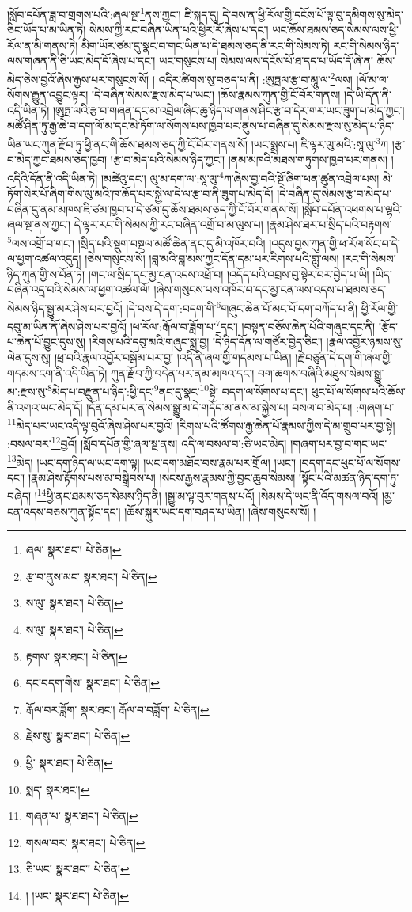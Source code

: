 །སློབ་དཔོན་ཟླ་བ་གྲགས་པའི་:ཞལ་སྔ་\footnote{ཞལ་  སྣར་ཐང་།  པེ་ཅིན། }ནས་ཀྱང་། ཇི་སྐད་དུ། དེ་བས་ན་ཕྱི་རོལ་གྱི་དངོས་པོ་ལྟ་བུ་དམིགས་སུ་མེད་ཅིང་ཡོད་པ་མ་ཡིན་ཏེ། སེམས་ཀྱི་རང་བཞིན་ཡིན་པའི་ཕྱིར་རོ་ཞེས་པ་དང་། ཡང་ཆོས་ཐམས་ཅད་སེམས་ལས་ཕྱི་རོལ་ན་མི་གནས་ཏེ། མིག་ཡོར་ཙམ་དུ་སྣང་བ་གང་ཡིན་པ་དེ་ཐམས་ཅད་ནི་རང་གི་སེམས་ཏེ། རང་གི་སེམས་ཉིད་ལས་གཞན་ནི་ཅི་ཡང་མེད་དོ་ཞེས་པ་དང་། ཡང་གསུངས་པ། སེམས་ལས་དངོས་པོ་ཐ་དད་པ་ཡོད་དོ་ཞེ་ན། ཆོས་མེད་ཅེས་བྱའོ་ཞེས་རྒྱས་པར་གསུངས་སོ། །
འདིར་ཚིགས་སུ་བཅད་པ་ནི། :ཨུཏྤལ་རྩ་བ་མཱུ་ལ་\footnote{རྩ་བ་ནུས་མང་  སྣར་ཐང་།  པེ་ཅིན། }ལས། །ལོ་མ་ལ་སོགས་རྒྱུན་འབྱུང་ལྟར། །དེ་བཞིན་སེམས་རྫས་མེད་པ་ཡང་། །ཆོས་རྣམས་ཀུན་གྱི་ངོ་བོར་གནས། །དེ་ཡི་དོན་ནི་འདི་ཡིན་ཏེ། །ཨུཏྤ་ལའི་རྩ་བ་གཞན་དང་མ་འབྲེལ་ཞིང་ཆུ་ཉིད་ལ་གནས་ཤིང་རྩ་བ་དེར་གར་ཡང་ཟུག་པ་མེད་ཀྱང་། མཚོ་ཤིན་ཏུ་རྒྱ་ཆེ་བ་དག་ལོ་མ་དང་མེ་ཏོག་ལ་སོགས་པས་ཁྱབ་པར་ནུས་པ་བཞིན་དུ་སེམས་རྫས་སུ་མེད་པ་ཉིད་ཡིན་ཡང་ཀུན་རྫོབ་ཏུ་ཕྱི་ནང་གི་ཆོས་ཐམས་ཅད་ཀྱི་ངོ་བོར་གནས་སོ། །ཡང་སྨྲས་པ། ཇི་ལྟར་ལུ་མའི་:སཱ་ལུ་\footnote{ས་ལུ་  སྣར་ཐང་།  པེ་ཅིན། }ཀ །རྩ་བ་མེད་ཀྱང་ཐམས་ཅད་ཁྱབ། །རྩ་བ་མེད་པའི་སེམས་ཉིད་ཀྱང་། །ནམ་མཁའི་མཐས་གཏུགས་ཁྱབ་པར་གནས། །འདིའི་དོན་ནི་འདི་ཡིན་ཏེ། །མཚེའུ་དང་། ལུ་མ་དག་ལ་:སཱ་ལུ་\footnote{ས་ལུ་  སྣར་ཐང་།  པེ་ཅིན། }ཀ་ཞེས་བྱ་བའི་སྔོ་ཞིག་ཕན་ཚུན་འབྲེལ་པས། མེ་ཏོག་སེར་པོ་ཞིག་གིས་ལུ་མའི་ཁ་ཆོད་པར་སྐྱེ་ལ་དེ་ལ་རྩ་བ་ནི་ཟུག་པ་མེད་དོ། །དེ་བཞིན་དུ་སེམས་རྩ་བ་མེད་པ་བཞིན་དུ་ནམ་མཁས་ཇི་ཙམ་ཁྱབ་པ་དེ་ཙམ་དུ་ཆོས་ཐམས་ཅད་ཀྱི་ངོ་བོར་གནས་སོ། །སློབ་དཔོན་འཕགས་པ་ལྷའི་ཞལ་སྔ་ནས་ཀྱང་། དེ་ལྟར་རང་གི་སེམས་ཀྱི་རང་བཞིན་འགྲོ་བ་མ་ལུས་པ། །རྣམ་ཤེས་ཐར་པ་སྲིད་པའི་བརྟགས་\footnote{རྟགས་  སྣར་ཐང་།  པེ་ཅིན། }ལས་འགྲོ་བ་གང་། །སྲིད་པའི་སྡུག་བསྔལ་མཚོ་ཆེན་ནང་དུ་མི་འཁོར་བའི། །འདུས་བྱས་ཀུན་གྱི་ཕ་རོལ་སོང་བ་དེ་ལ་ཕྱག་འཚལ་འདུད། །ཅེས་གསུངས་སོ། །བླ་མའི་བླ་མས་ཀྱང་དོན་དམ་པར་རིགས་པའི་གླུ་ལས། །རང་གི་སེམས་ཉིད་ཀུན་གྱི་ས་བོན་ཏེ། །གང་ལ་སྲིད་དང་མྱ་ངན་འདས་འཕྲོ་བ། །འདོད་པའི་འབྲས་བུ་སྟེར་བར་བྱེད་པ་ཡི། །ཡིད་བཞིན་འདྲ་བའི་སེམས་ལ་ཕྱག་འཚལ་ལོ། །ཞེས་གསུངས་པས་འཁོར་བ་དང་མྱ་ངན་ལས་འདས་པ་ཐམས་ཅད་སེམས་ཉིད་སྒྱུ་མར་ཤེས་པར་བྱའོ། །དེ་བས་དེ་དག་:བདག་གི་\footnote{དང་བདག་གིས་  སྣར་ཐང་།  པེ་ཅིན། }གཞུང་ཆེན་པོ་མང་པོ་དག་བཀོད་པ་ནི། ཕྱི་རོལ་གྱི་དབུ་མ་ཡིན་ནོ་ཞེས་ཤེས་པར་བྱའོ། །ཕ་རོལ་:རྒོལ་བ་ཟློག་པ་\footnote{རྒོལ་བར་ཟློག་  སྣར་ཐང་། རྒོལ་བ་བཟློག་  པེ་ཅིན། }དང་། །བསྟན་བཅོས་ཆེན་པོའི་གཞུང་དང་ནི། །རྩོད་པ་ཆེན་པོ་བྱུང་དུས་སུ། །རིགས་པའི་དབུ་མའི་གཞུང་སྨྲ་བྱ། །དེ་ཉིད་དོན་ལ་གཙོར་བྱེད་ཅིང་། །རྣལ་འབྱོར་ཉམས་སུ་ལེན་དུས་སུ། །ཕྲ་བའི་རྣལ་འབྱོར་བསྒོམ་པར་བྱ། །འདི་ནི་ཞལ་གྱི་གདམས་པ་ཡིན། །རྗེ་བཙུན་དེ་དག་གི་ཞལ་གྱི་གདམས་ངག་ནི་འདི་ཡིན་ཏེ། ཀུན་རྫོབ་ཀྱི་བདེན་པར་ནམ་མཁའ་དང་། བག་ཆགས་བཞིའི་མཐུས་སེམས་སྒྱུ་མ་:རྫས་སུ་\footnote{རྗེས་སུ་  སྣར་ཐང་།  པེ་ཅིན། }མེད་པ་བརྫུན་པ་ཉིད་:ཕྱི་དང་\footnote{ཕྱི་  སྣར་ཐང་།  པེ་ཅིན། }ནང་དུ་སྣང་\footnote{སྨད་  སྣར་ཐང་། }སྟེ། བདག་ལ་སོགས་པ་དང་། ཕུང་པོ་ལ་སོགས་པའི་ཆོས་ནི་འགའ་ཡང་མེད་དོ། །དོན་དམ་པར་ན་སེམས་སྒྱུ་མ་དེ་གདོད་མ་ནས་མ་སྐྱེས་པ། བསལ་བ་མེད་པ། :གཞག་པ་\footnote{གཞན་པ་  སྣར་ཐང་།  པེ་ཅིན། }མེད་པར་ཡང་འདི་ལྟ་བུའོ་ཞེས་ཤེས་པར་བྱའོ། །རིགས་པའི་ཚོགས་རྒྱ་ཆེན་པོ་རྣམས་ཀྱིས་དེ་མ་གྲུབ་པར་བྱ་སྟེ། :བསལ་བར་\footnote{གསལ་བར་  སྣར་ཐང་།  པེ་ཅིན། }བྱའོ། །སློབ་དཔོན་གྱི་ཞལ་སྔ་ནས། འདི་ལ་བསལ་བ་:ཅི་ཡང་མེད། །གཞག་པར་བྱ་བ་གང་ཡང་\footnote{ཅི་ཡང་  སྣར་ཐང་།  པེ་ཅིན། }མེད། །ཡང་དག་ཉིད་ལ་ཡང་དག་ལྟ། །ཡང་དག་མཐོང་བས་རྣམ་པར་གྲོལ། །ཡང་། །བདག་དང་ཕུང་པོ་ལ་སོགས་དང་། །རྣམ་ཤེས་རྟོགས་པས་མ་བསྒྲིབས་པ། །སངས་རྒྱས་རྣམས་ཀྱི་བྱང་ཆུབ་སེམས། །སྟོང་པའི་མཚན་ཉིད་དག་ཏུ་བཞེད། །\footnote{། །ཡང་  སྣར་ཐང་།  པེ་ཅིན། }ཕྱི་ནང་ཐམས་ཅད་སེམས་ཉིད་ནི། །སྒྱུ་མ་ལྟ་བུར་གནས་པའོ། །སེམས་དེ་ཡང་ནི་འོད་གསལ་བའོ། །མྱ་ངན་འདས་བཅས་ཀུན་སྟོང་དང་། །ཆོས་སྐུར་ཡང་དག་བཤད་པ་ཡིན། །ཞེས་གསུངས་སོ། །
